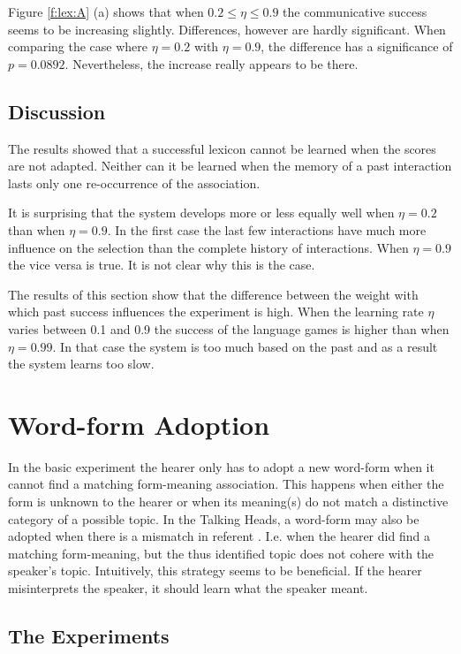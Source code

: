 Figure \ref{f:lex:A} (a) shows that  when $0.2 \leq \eta \leq 0.9$ the communicative success seems to be increasing slightly. Differences, however are hardly significant. When comparing the case where $\eta=0.2$ with $\eta=0.9$, the difference has a significance of $p=0.0892$. Nevertheless, the increase really appears to be there. 

\subsection{Discussion}

The results showed that a successful lexicon cannot be learned when the scores are not adapted. Neither can it be learned when the memory of a past interaction lasts only one re-occurrence of the association.

It is surprising that the system develops more or less equally well when $\eta=0.2$ than when $\eta=0.9$. In the first case the last few interactions have much more influence on the selection than the complete history of interactions. When $\eta=0.9$ the vice versa is true. It is not clear why this is the case.


The results of this section show that the difference between the weight with which past success influences the experiment is high. When the learning rate $\eta$ varies between 0.1 and 0.9 the success of the language games is higher than when $\eta=0.99$. In that case the system is too much based on the past and as a result the system learns too slow.


\section{Word-form Adoption}\label{s:par:adopt}

In the basic experiment the hearer only has to adopt a new word-form when it cannot find a matching form-meaning association. This happens when either the form is unknown to the hearer or when its meaning(s) do not match a distinctive category of a possible topic. In the Talking Heads, a word-form may also be adopted when there is a mismatch in referent \citep{steels:2000}. I.e. when the hearer did find a matching form-meaning, but the thus identified topic does not cohere with the speaker's topic. Intuitively, this strategy seems to be beneficial. If the hearer misinterprets the speaker, it should learn what the speaker meant.

\subsection{The Experiments}

